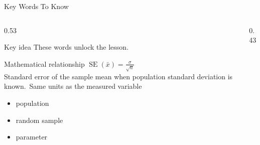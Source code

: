 \documentclass[aspectratio=169]{beamer}
\begin{document}
\begin{frame}{Key Words To Know}
\begin{columns}[T]
\begin{column}{0.53\textwidth}
\begin{alertblock}{Key idea}
\small These words unlock the lesson.
\end{alertblock}

\begin{block}{Mathematical relationship}
\centering\Large $\operatorname{SE}(\bar{x})=\frac{\sigma}{\sqrt{n}}$\\[0.12cm]
\small Standard error of the sample mean when population standard deviation is known.\ Same units as the measured variable
\end{block}

\begin{itemize}
\small
\item population
\item random sample
\item parameter
\end{itemize}
\end{column}
\begin{column}{0.43\textwidth}
\begin{center}\end{center}
\end{column}
\end{columns}

\end{frame}
\end{document}
